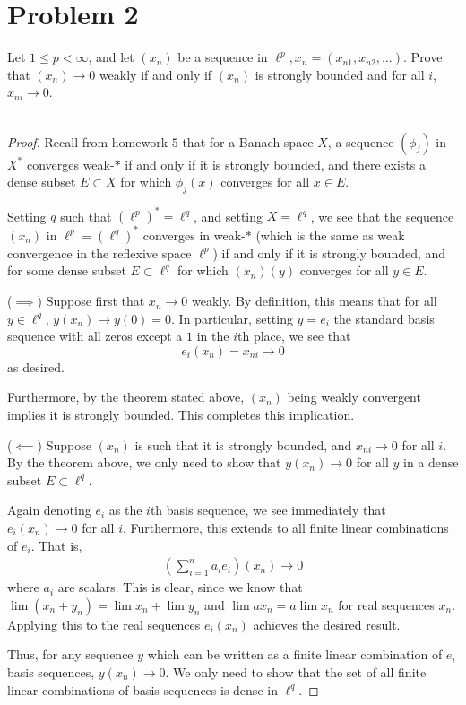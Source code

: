 \documentclass[fontsize=11pt]{scrartcl} %
\numberwithin{equation}{section} %
\numberwithin{figure}{section} %
\numberwithin{table}{section} %
\begin{document}
\section*{Problem 2}
Let $1\leq p <\infty$, and let $(x_n)$ be a sequence in $\ell^p, x_n =
(x_{n1},x_{n2},\dots)$. Prove that $(x_n)\to 0$ weakly if and only if $(x_n)$ is
strongly bounded and for all $i$, $x_{ni}\to 0$.
\\
\\
\begin{proof}
Recall from homework $5$ that for a Banach space $X$, a sequence $(\phi_j)$ in
$X^*$ converges weak-$*$ if and only if it is strongly bounded, and there exists
a dense subset $E\subset X$ for which $\phi_j(x)$ converges for all $x\in E$. 

Setting $q$ such that $(\ell^p)^* = \ell^q$, and setting $X=\ell^q$, we see that
the sequence $(x_n)$ in $\ell^p = (\ell^q)^*$ converges in weak-$*$ (which is
the same as weak convergence in the reflexive space $\ell^p$) if and only
if it is strongly bounded, and for some dense subset $E\subset \ell^q$ for which
$(x_n)(y)$ converges for all $y\in E$.

($\implies$)
Suppose first that $x_n\to 0$ weakly. By definition, this means that for all
$y\in\ell^q$, $y(x_n)\to y(0)=0$. In particular, setting $y=e_i$ the standard
basis sequence with all zeros except a $1$ in the $i$th place, we see that
\[
    e_i(x_n) = x_{ni}\to 0
\]
as desired.

Furthermore, by the theorem stated above, $(x_n)$ being weakly convergent
implies it is strongly bounded. This completes this implication.

($\impliedby$)
Suppose $(x_n)$ is such that it is strongly bounded, and $x_{ni}\to 0$ for all
$i$. By the theorem above, we only need to show that $y(x_n)\to 0$ for all $y$
in a dense subset $E\subset \ell^q$. 

Again denoting $e_i$ as the $i$th basis sequence, we see immediately that
$e_i(x_n)\to 0$ for all $i$. Furthermore, this extends to all finite linear
combinations of $e_i$. That is,
\[
    \begin{aligned}
        \left(\sum_{i=1}^{n} a_ie_i\right)(x_n) \to 0
    \end{aligned}
\]
where $a_i$ are scalars. This is clear, since we know that $\lim (x_n+y_n) =
\lim x_n + \lim y_n$ and $\lim ax_n = a\lim x_n$ for real sequences $x_n$.
Applying this to the real sequences $e_i(x_n)$ achieves the desired result.

Thus, for any sequence $y$ which can be written as a finite linear combination of
$e_i$ basis sequences, $y(x_n)\to 0$. We only need to show that the set of all
finite linear combinations of basis sequences is dense in $\ell^q$. 


\end{proof}
\end{document}
